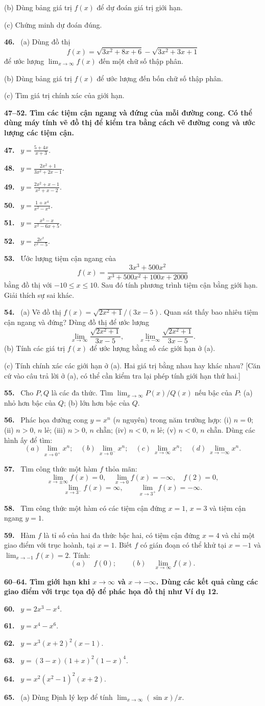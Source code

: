 \documentclass[12pt,a4paper]{article}
\newcommand{\bt}[1]{\par\smallskip\noindent\textbf{#1.}\ }
\newcommand{\group}[1]{\par\medskip\noindent\textbf{#1}\par\nopagebreak[4]}
\begin{document}
(b) Dùng bảng giá trị $f(x)$ để dự đoán giá trị giới hạn.

(c) Chứng minh dự đoán đúng.
\bt{46} (a) Dùng đồ thị
\[f(x)=\sqrt{3x^2+8x+6}-\sqrt{3x^2+3x+1}\]
để ước lượng $\lim_{x\to\infty}f(x)$ đến một chữ số thập phân.

(b) Dùng bảng giá trị $f(x)$ để ước lượng đến bốn chữ số thập phân.

(c) Tìm giá trị chính xác của giới hạn.
\group{47–52. Tìm các tiệm cận ngang và đứng của mỗi đường cong. Có thể dùng máy tính vẽ đồ thị để kiểm tra bằng cách vẽ đường cong và ước lượng các tiệm cận.}
\bt{47} $\displaystyle y=\frac{5+4x}{x+3}$.
\bt{48} $\displaystyle y=\frac{2x^2+1}{3x^2+2x-1}$.
\bt{49} $\displaystyle y=\frac{2x^2+x-1}{x^2+x-2}$.
\bt{50} $\displaystyle y=\frac{1+x^4}{x^2-x^4}$.
\bt{51} $\displaystyle y=\frac{x^3-x}{x^2-6x+5}$.
\bt{52} $\displaystyle y=\frac{2e^x}{e^x-5}$.
\bt{53} Ước lượng tiệm cận ngang của
\[f(x)=\frac{3x^3+500x^2}{x^3+500x^2+100x+2000}\]
bằng đồ thị với $-10\le x\le10$. Sau đó tính phương trình tiệm cận bằng giới hạn. Giải thích sự sai khác.
\bt{54} (a) Vẽ đồ thị $f(x)=\sqrt{2x^2+1}/(3x-5)$. Quan sát thấy bao nhiêu tiệm cận ngang và đứng? Dùng đồ thị để ước lượng
\[\lim_{x\to\infty}\frac{\sqrt{2x^2+1}}{3x-5},\qquad\lim_{x\to-\infty}\frac{\sqrt{2x^2+1}}{3x-5}.\]
(b) Tính các giá trị $f(x)$ để ước lượng bằng số các giới hạn ở (a).

(c) Tính chính xác các giới hạn ở (a). Hai giá trị bằng nhau hay khác nhau? [Căn cứ vào câu trả lời ở (a), có thể cần kiểm tra lại phép tính giới hạn thứ hai.]
\bt{55} Cho $P,Q$ là các đa thức. Tìm $\lim_{x\to\infty}P(x)/Q(x)$ nếu bậc của $P$: (a) nhỏ hơn bậc của $Q$; (b) lớn hơn bậc của $Q$.
\bt{56} Phác họa đường cong $y=x^n$ ($n$ nguyên) trong năm trường hợp: (i) $n=0$; (ii) $n>0$, $n$ lẻ; (iii) $n>0$, $n$ chẵn; (iv) $n<0$, $n$ lẻ; (v) $n<0$, $n$ chẵn. Dùng các hình ấy để tìm:
\[(a)\ \lim_{x\to0^+}x^n;\quad(b)\ \lim_{x\to0^-}x^n;\quad(c)\ \lim_{x\to\infty}x^n;\quad(d)\ \lim_{x\to-\infty}x^n.\]
\bt{57} Tìm công thức một hàm $f$ thỏa mãn:
\[\lim_{x\to\pm\infty}f(x)=0,\quad\lim_{x\to0}f(x)=-\infty,\quad f(2)=0,\]
\[\lim_{x\to3^-}f(x)=\infty,\qquad\lim_{x\to3^+}f(x)=-\infty.\]
\bt{58} Tìm công thức một hàm có các tiệm cận đứng $x=1$, $x=3$ và tiệm cận ngang $y=1$.
\bt{59} Hàm $f$ là tỉ số của hai đa thức bậc hai, có tiệm cận đứng $x=4$ và chỉ một giao điểm với trục hoành, tại $x=1$. Biết $f$ có gián đoạn có thể khử tại $x=-1$ và $\lim_{x\to-1}f(x)=2$. Tính:
\[(a)\quad f(0);\qquad(b)\quad\lim_{x\to\infty}f(x).\]
\group{60–64. Tìm giới hạn khi $x\to\infty$ và $x\to-\infty$. Dùng các kết quả cùng các giao điểm với trục tọa độ để phác họa đồ thị như Ví dụ 12.}
\bt{60} $y=2x^3-x^4$.
\bt{61} $y=x^4-x^6$.
\bt{62} $y=x^3(x+2)^2(x-1)$.
\bt{63} $y=(3-x)(1+x)^2(1-x)^4$.
\bt{64} $y=x^2(x^2-1)^2(x+2)$.
\bt{65} (a) Dùng Định lý kẹp để tính $\lim_{x\to\infty}(\sin x)/x$.
\end{document}
